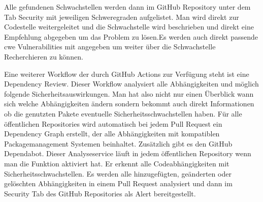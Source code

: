 Alle gefundenen Schwachstellen werden dann im GitHub Repository unter dem Tab Security mit jeweiligen Schweregraden aufgelistet. Man wird direkt zur Codestelle weitergeleitet und die Schwachstelle wird beschrieben und direkt eine Empfehlung abgegeben um das Problem zu lösen.Es werden auch direkt passende \ac{cwe} Vulnerabilities mit angegeben um weiter über die Schwachstelle Recherchieren zu können. \cite{code-scanning}

Eine weiterer Workflow der durch GitHub Actions zur Verfügung steht ist eine Dependency Review. Dieser Workflow analysiert alle Abhängigkeiten und möglich folgende Sicherheitsauswirkungen. Man hat also nicht nur einen Überblick wann sich welche Abhängigkeiten ändern sondern bekommt auch direkt Informationen ob die genutzten Pakete eventuelle Sicherheitsschwachstellen haben.
Für alle öffentlichen Repositories wird automatisch bei jedem Pull Request ein Dependency Graph erstellt, der alle Abhängigkeiten mit kompatiblen Packagemanagement Systemen beinhaltet.
Zusätzlich gibt es den GitHub Dependabot. Dieser Analyseservice läuft in jedem öffentlichen Repository wenn man die Funktion aktiviert hat. Er erkennt alle Codeabhängigkeiten mit Sicherheitsschwachstellen. Es werden alle hinzugefügten, geänderten oder gelöschten Abhängigkeiten in einem Pull Request analysiert und dann im Security Tab des GitHub Repositories als Alert bereitgestellt.

